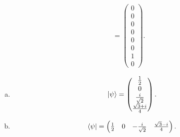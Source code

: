 \documentclass[12pt]{extarticle}
\begin{document}
\begin{align*}
& = \begin{pmatrix} 0 \\ 0 \\ 0 \\ 0 \\ 0 \\ 0 \\ 1 \\ 0 \end{pmatrix}.
\end{align*}


\begin{enumerate}[(a)]
\item
\[
\ket{\psi} = \begin{pmatrix} \frac{1}{2} \\ 0 \\ \frac{i}{\sqrt{2}} \\ \frac{\sqrt{3}+i}{4} \end{pmatrix}.
\]

\item
\[
\bra{\psi} = \begin{pmatrix} \frac{1}{2} & 0 & -\frac{i}{\sqrt{2}} & \frac{\sqrt{3}-i}{4} \end{pmatrix}.
\]
\end{enumerate}
\end{document}
